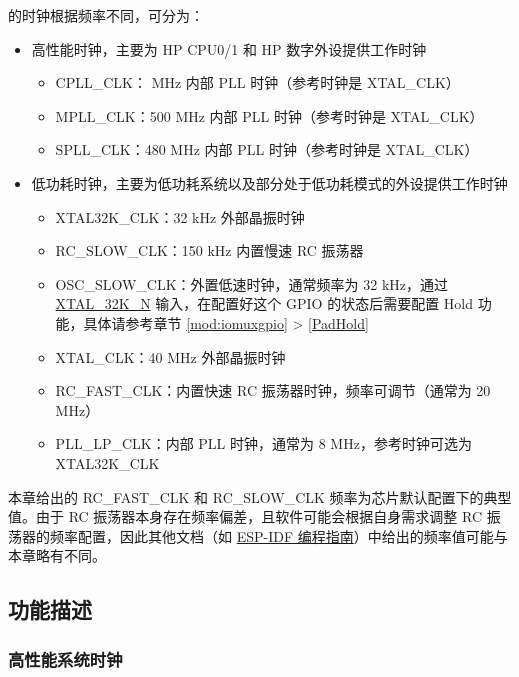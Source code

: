 \documentclass[main\_\_CN.tex]{subfiles}
\begin{document}
\chipname{} 的时钟根据频率不同，可分为：
\begin{itemize}
    \item 高性能时钟，主要为 HP CPU0/1 和 HP 数字外设提供工作时钟
    \begin{itemize}
        \item CPLL\_CLK： MHz 内部 PLL 时钟（参考时钟是 XTAL\_CLK）
        \item MPLL\_CLK：500 MHz 内部 PLL 时钟（参考时钟是 XTAL\_CLK）
        \item SPLL\_CLK：480 MHz 内部 PLL 时钟（参考时钟是 XTAL\_CLK）
    \end{itemize}
    \item 低功耗时钟，主要为低功耗系统以及部分处于低功耗模式的外设提供工作时钟
    \begin{itemize}
        \item XTAL32K\_CLK：32 kHz 外部晶振时钟
	\item RC\_SLOW\_CLK：150 kHz 内置慢速 RC 振荡器
	\item OSC\_SLOW\_CLK：外置低速时钟，通常频率为 32 kHz，通过 \hyperref[tab:ANA-IO-MUX-CN]{XTAL\_32K\_N} 输入，在配置好这个 GPIO 的状态后需要配置 Hold 功能，具体请参考章节 \ref{mod:iomuxgpio} \textit{} > \ref{PadHold} \textit{}
        \item XTAL\_CLK：40 MHz 外部晶振时钟
        \item RC\_FAST\_CLK：内置快速 RC 振荡器时钟，频率可调节（通常为 20 MHz）
        \item PLL\_LP\_CLK：内部 PLL 时钟，通常为 8 MHz，参考时钟可选为 XTAL32K\_CLK
    \end{itemize}
\end{itemize}

\begin{tiplisting}
本章给出的 RC\_FAST\_CLK 和 RC\_SLOW\_CLK 频率为芯片默认配置下的典型值。由于 RC 振荡器本身存在频率偏差，且软件可能会根据自身需求调整 RC 振荡器的频率配置，因此其他文档（如 \href{https://docs.espressif.com/projects/esp-idf/zh_CN/latest/esp32p4/api-reference/peripherals/clk_tree.html}{ESP-IDF 编程指南}）中给出的频率值可能与本章略有不同。
\end{tiplisting}

\subsection{功能描述}

\subsubsection{高性能系统时钟}
\end{document}
